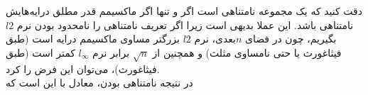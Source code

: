 دقت کنید که یک مجموعه نامتناهی است اگر و تنها اگر 
ماکسیمم قدر مطلق درایه‌هایش نامتناهی باشد. این عملا بدیهی است زیرا اگر تعریف نامتناهی را نامحدود بودن نرم $l2$ بگیریم، چون در فضای $n$بعدی، نرم $l2$ بزرگتر مساوی ماکسیمم درایه است  (طبق فیثاغورث یا حتی نامساوی مثلث) و همچنین از
$\sqrt{n}$
برابر نرم $l_\infty$ کمتر است (طبق فیثاغورث)، می‌توان این فرض را کرد.\\
در نتیجه نامتناهی بودن، معادل با این است که 